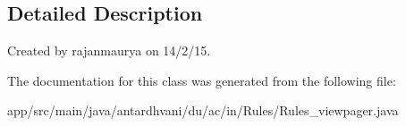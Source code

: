 \subsection{Detailed Description}
Created by rajanmaurya on 14/2/15. 

The documentation for this class was generated from the following file\+:\begin{DoxyCompactItemize}
\item 
app/src/main/java/antardhvani/du/ac/in/\+Rules/Rules\+\_\+viewpager.\+java\end{DoxyCompactItemize}
